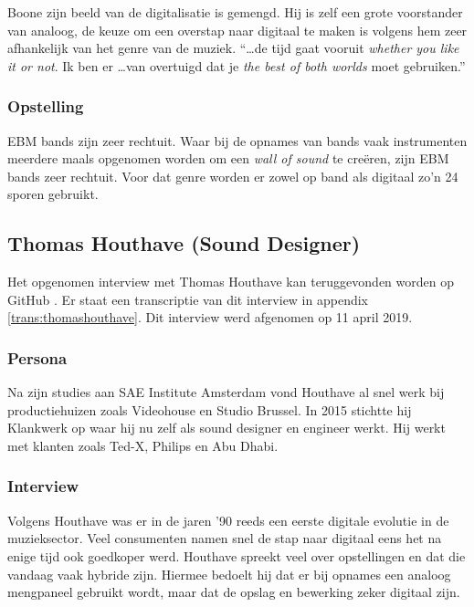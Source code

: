 Boone zijn beeld van de digitalisatie is gemengd. Hij is zelf een grote voorstander van analoog, de keuze om een overstap naar digitaal te maken is volgens hem zeer afhankelijk van het genre van de muziek.  ``\ldots de tijd gaat vooruit \textit{whether you like it or not}. Ik ben er \ldots van overtuigd dat je \textit{the best of both worlds} moet gebruiken.'' \autocite{peterboone}

\subsubsection*{Opstelling}

EBM bands zijn zeer rechtuit. Waar bij de opnames van bands vaak instrumenten meerdere maals opgenomen worden om een \textit{wall of sound} te creëren, zijn EBM bands zeer rechtuit. Voor dat genre worden er zowel op band als digitaal zo'n 24 sporen gebruikt.

\subsection{Thomas Houthave (Sound Designer)}

Het opgenomen interview met Thomas Houthave kan teruggevonden worden op GitHub \autocite{thomashouthave}. Er staat een transcriptie van dit interview in appendix \ref{trans:thomashouthave}. Dit interview werd afgenomen op 11 april 2019.

\subsubsection*{Persona}

Na zijn studies aan SAE Institute Amsterdam vond Houthave al snel werk bij productiehuizen zoals Videohouse en Studio Brussel. In 2015 stichtte hij Klankwerk op waar hij nu zelf als sound designer en engineer werkt. Hij werkt met klanten zoals Ted-X, Philips en Abu Dhabi. \autocite{klankwerkbio}

\subsubsection*{Interview}

Volgens Houthave was er in de jaren '90 reeds een eerste digitale evolutie in de muzieksector. Veel consumenten namen snel de stap naar digitaal eens het na enige tijd ook goedkoper werd. Houthave spreekt veel over opstellingen en dat die vandaag vaak hybride zijn. Hiermee bedoelt hij dat er bij opnames een analoog mengpaneel gebruikt wordt, maar dat de opslag en bewerking zeker digitaal zijn. \autocite{thomashouthave}

